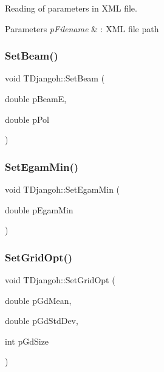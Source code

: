 Reading of parameters in X\+ML file. 


\begin{DoxyParams}{Parameters}
{\em p\+Filename} & \+: X\+ML file path \\
\hline
\end{DoxyParams}
\mbox{\label{class_t_djangoh_a6995df5cd413a9e998fe8c0836004363}} 
\subsubsection{\texorpdfstring{Set\+Beam()}{SetBeam()}}
{\footnotesize\ttfamily void T\+Djangoh\+::\+Set\+Beam (\begin{DoxyParamCaption}\item[{double}]{p\+BeamE,  }\item[{double}]{p\+Pol }\end{DoxyParamCaption})}

\mbox{\label{class_t_djangoh_afaea9aa0144bded9b0fa1fb85b4cbb36}} 
\subsubsection{\texorpdfstring{Set\+Egam\+Min()}{SetEgamMin()}}
{\footnotesize\ttfamily void T\+Djangoh\+::\+Set\+Egam\+Min (\begin{DoxyParamCaption}\item[{double}]{p\+Egam\+Min }\end{DoxyParamCaption})}

\mbox{\label{class_t_djangoh_ae1c46a20056315d4c43c8a4f72eb2f19}} 
\subsubsection{\texorpdfstring{Set\+Grid\+Opt()}{SetGridOpt()}}
{\footnotesize\ttfamily void T\+Djangoh\+::\+Set\+Grid\+Opt (\begin{DoxyParamCaption}\item[{double}]{p\+Gd\+Mean,  }\item[{double}]{p\+Gd\+Std\+Dev,  }\item[{int}]{p\+Gd\+Size }\end{DoxyParamCaption})}

